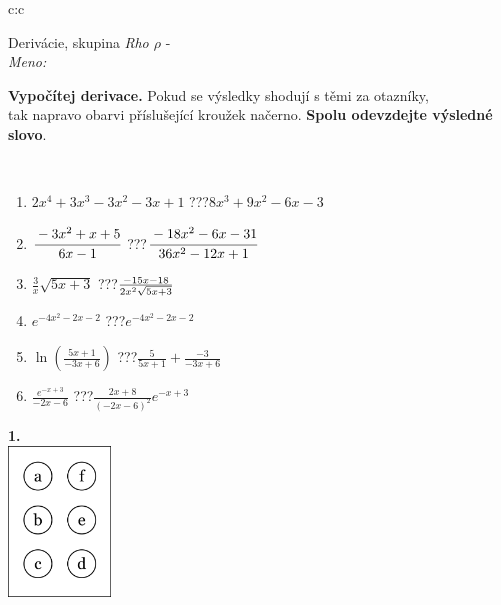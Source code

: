 \documentclass[10pt]{report}
\begin{document}
\begin{tabular}{c:c}
\begin{minipage}[c][104.5mm][t]{0.5\linewidth}
\begin{center}
\vspace{7mm}
{\huge Derivácie, skupina \textit{Rho $\rho$} -}\\[5mm]
\textit{Meno:}\phantom{xxxxxxxxxxxxxxxxxxxxxxxxxxxxxxxxxxxxxxxxxxxxxxxxxxxxxxxxxxxxxxxxx}\\[5mm]
\begin{minipage}{0.95\linewidth}
\begin{center}
\textbf{Vypočítej derivace.} Pokud se výsledky shodují s těmi za otazníky,\\tak napravo obarvi příslušející kroužek načerno. \textbf{Spolu odevzdejte výsledné slovo}.
\end{center}
\end{minipage}
\\[1mm]
\begin{minipage}{0.79\linewidth}
\begin{center}
\begin{varwidth}{\linewidth}
\begin{enumerate}
\normalsize
\item $2x^4+3x^3-3x^2-3x+1$\quad \dotfill\; ???\;\dotfill \quad $8x^3+9x^2-6x-3$
\item $\cfrac{-3x^2+x+5}{6x-1}$\quad \dotfill\; ???\;\dotfill \quad $\cfrac{-18x^2-6x-31}{36x^2-12x+1}$
\item $\frac{3}{x}\sqrt{5x+3}$\quad \dotfill\; ???\;\dotfill \quad $\frac{-15x-18}{2x^2 \sqrt{\smash[b]{5x+3}}}$
\item $e^{-4x^2-2x-2}$\quad \dotfill\; ???\;\dotfill \quad $e^{-4x^2-2x-2}$
\item $\ln{\left(\frac{5x+1}{-3x+6}\right)}$\quad \dotfill\; ???\;\dotfill \quad $\frac{5}{5x+1}+\frac{-3}{-3x+6}$
\item $\frac{e^{-x+3}}{-2x-6}$\quad \dotfill\; ???\;\dotfill \quad $\frac{2x+8}{(-2x-6)^2}e^{-x+3}$
\end{enumerate}
\end{varwidth}
\end{center}
\end{minipage}
\begin{minipage}{0.20\linewidth}
\begin{center}
{\Huge\bfseries 1.} \\[2mm]
\includegraphics[height=40mm]{../images/braille.png}

\end{center}
\end{minipage}
\end{center}
\end{minipage}
\end{tabular}
\end{document}
